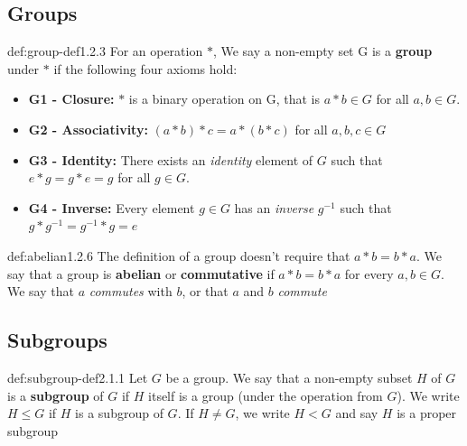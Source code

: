 \documentclass[landscape, 8pt]{extarticle}
\begin{document}
\begin{multicols}{3}

\subsection*{Groups}

\begin{dfn}[Groups]{def:group-def}{1.2.3}
    For an operation $\ast$, We say a non-empty set G is a \textbf{group} under $\ast$ if the following four axioms hold:
    \renewcommand\labelitemi{\tiny$\bullet$}
    \begin{itemize}
        \setlength\itemsep{0em}
        \item \textbf{G1 - Closure:} $\ast$ is a binary operation on G, that is $a\ast b \in G$ for all $a,b\in G$.
        \item \textbf{G2 - Associativity:} $(a\ast b) \ast c =a\ast(b\ast c)$ for all $a,b,c\in G$
        \item \textbf{G3 - Identity:} There exists an \textit{identity} element of $G$ such that $e\ast g = g\ast e = g$ for all $g\in G$.
        \item \textbf{G4 - Inverse:} Every element $g\in G$ has an \textit{inverse} $g^{-1}$ such that $g\ast g^{-1}=g^{-1}\ast g = e$
    \end{itemize}
\end{dfn}
\vspace{-5pt}

\begin{dfn}{def:abelian}{1.2.6}
    The definition of a group doesn't require that $a\ast b = b\ast a$.
    We say that a group is \textbf{abelian} or \textbf{commutative} if $a\ast b = b\ast a$ for every $a,b\in G$. We say that $a$ \textit{commutes} with $b$, or that $a$ and $b$ \textit{commute}
\end{dfn}
\vspace{-5pt}



\subsection*{Subgroups}

\begin{dfn}[Subgroups]{def:subgroup-def}{2.1.1}
    Let $G$ be a group. We say that a non-empty subset $H$ of $G$ is a \textbf{subgroup} of $G$ if $H$ itself is a group (under the operation from $G$). We write $H\le G$ if $H$ is a subgroup of $G$. If $H\ne G$, we write $H<G$ and say $H$ is a proper subgroup
\end{dfn}
\vspace{-5pt}


\end{multicols}
\end{document}
